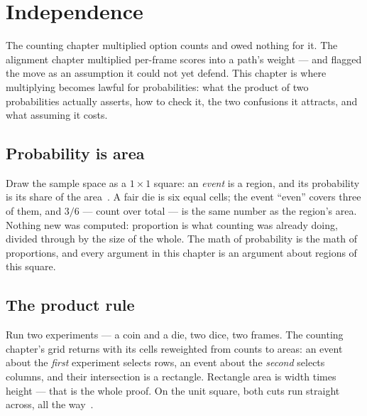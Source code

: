 \chapter{Independence}

\begin{narrative}
The counting chapter multiplied option counts and owed nothing for it.
The alignment chapter multiplied per-frame scores into a path's weight —
and flagged the move as an assumption it could not yet defend. This
chapter is where multiplying becomes lawful for probabilities: what the
product of two probabilities actually asserts, how to check it, the two
confusions it attracts, and what assuming it costs.

\section{Probability is area}

Draw the sample space as a $1 \times 1$ square: an \emph{event} is a
region, and its probability is its share of the
area~\cite{probability-3blue1brown-bayes-theorem-lesson}. A fair die is
six equal cells; the event ``even'' covers three of them, and
$3/6$ — count over total — is the same number as the region's area.
Nothing new was computed: proportion is what counting was already doing,
divided through by the size of the whole. The math of probability is the
math of proportions, and every argument in this chapter is an argument
about regions of this square.

\section{The product rule}

Run two experiments — a coin and a die, two dice, two frames. The
counting chapter's grid returns with its cells reweighted from counts to
areas: an event about the \emph{first} experiment selects rows, an event
about the \emph{second} selects columns, and their intersection is a
rectangle. Rectangle area is width times height — that is the whole
proof. On the unit square, both cuts run straight across, all the
way~\cite{probability-tsvibt-jaime-sevilla-mollina-two-independent-events-square-v}.


\end{narrative}
